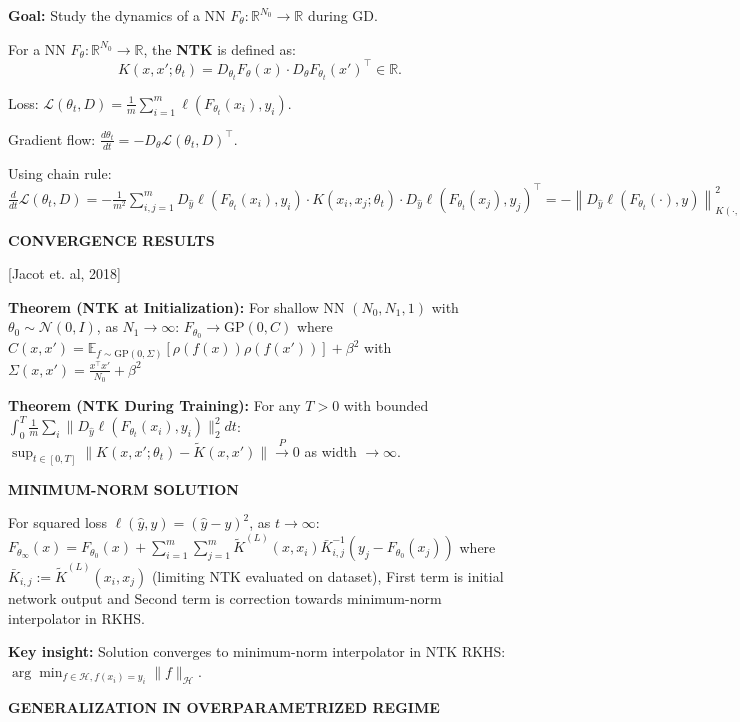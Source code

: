 \documentclass[a4paper,10pt]{article}
\def\R{\mathbb{R}}
\newcommand{\subtitle}[1]{\vspace{0.25cm}\begin{normalsize}\textbf{\textcolor{gray!150}{\uppercase{#1}}}\end{normalsize}}
\begin{document}
\begin{small}
\textbf{Goal:} Study the dynamics of a NN $F_\theta : \R^{N_0} \to \R$ during GD.

\begin{subbox_noTitle}
For a NN \( F_{\theta} : \mathbb{R}^{N_0} \rightarrow \mathbb{R} \), the \textbf{NTK} is defined as:
\[
K(x, x'; \theta_t) = D_{\theta_t} F_{\theta}(x) \cdot D_{\theta} F_{\theta_t}(x')^\top \in \mathbb{R}.
\]
\end{subbox_noTitle}

Loss: $\mathcal{L}(\theta_t, D) = \frac{1}{m} \sum_{i=1}^m \ell(F_{\theta_t}(x_i), y_i)$.

Gradient flow: $\frac{d\theta_t}{dt} = - D_\theta \mathcal{L}(\theta_t, D)^\top$.

Using chain rule:
$\frac{d}{dt} \mathcal{L}(\theta_t, D) = - \frac{1}{m^2} \sum_{i,j=1}^m D_{\hat{y}} \ell(F_{\theta_t}(x_i), y_i) \cdot K(x_i, x_j; \theta_t) \cdot D_{\hat{y}} \ell(F_{\theta_t}(x_j), y_j)^\top 
= - \left\| D_{\hat{y}} \ell(F_{\theta_t}(\cdot), y) \right\|_{K(\cdot, \cdot, \theta_t), D}^2$


\subtitle{Convergence Results} [Jacot et. al, 2018]

\textbf{Theorem (NTK at Initialization):} For shallow NN $(N_0,N_1,1)$ with $\theta_0 \sim \mathcal{N}(0,I)$, as $N_1 \to \infty$:
$F_{\theta_0} \to \text{GP}(0,C)$ where
$C(x,x') = \mathbb{E}_{f \sim \text{GP}(0,\Sigma)}[\rho(f(x))\rho(f(x'))] + \beta^2$
with $\Sigma(x,x') = \frac{x^\top x'}{N_0} + \beta^2$

\textbf{Theorem (NTK During Training):} For any $T>0$ with bounded $\int_0^T \frac{1}{m}\sum_i \|D_{\hat{y}}\ell(F_{\theta_t}(x_i),y_i)\|_2^2dt$:
$\sup_{t\in[0,T]}\|K(x,x';\theta_t) - \tilde{K}(x,x')\| \xrightarrow{P} 0$ as width $\to \infty$.   

\subtitle{Minimum-Norm Solution}

For squared loss $\ell(\hat{y},y) = (\hat{y}-y)^2$, as $t \to \infty$:
$F_{\theta_\infty}(x) = F_{\theta_0}(x) + \sum_{i=1}^m \sum_{j=1}^m \tilde{K}^{(L)}(x,x_i)\bar{K}_{i,j}^{-1}(y_j - F_{\theta_0}(x_j))$
where $\bar{K}_{i,j} := \tilde{K}^{(L)}(x_i,x_j)$ (limiting NTK evaluated on dataset), First term is initial network output
and Second term is correction towards minimum-norm interpolator in RKHS.

\textbf{Key insight:} Solution converges to minimum-norm interpolator in NTK RKHS:
$\arg\min_{f \in \mathcal{H}, f(x_i)=y_i} \|f\|_{\mathcal{H}}$.

\subtitle{Generalization in Overparametrized Regime}


\end{small}
\end{document}

